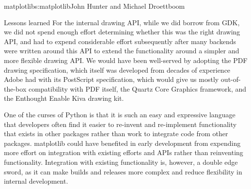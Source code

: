 \begin{aosachapter}{matplotlib}{s:matplotlib}{John Hunter and Michael Droettboom}
\begin{aosasect1}{Lessons learned}
For the internal drawing API, while we did borrow from GDK, we did not
spend enough effort determining whether this was the right drawing
API, and had to expend considerable effort subsequently after many
backends were written around this API to extend the functionality
around a simpler and more flexible drawing API.  We would have been
well-served by adopting the PDF drawing specification, which itself
was developed from decades of experience Adobe had with its PostScript
specification, which would give us mostly out-of-the-box compatibility
with PDF itself, the Quartz Core Graphics framework, and the Enthought
Enable Kiva drawing kit.

One of the curses of Python is that it is such an easy and expressive
language that developers often find it easier to re-invent and
re-implement functionality that exists in other packages rather than
work to integrate code from other packages.  matplotlib could have
benefited in early development from expending more effort on
integration with existing efforts and APIs rather than reinventing
functionality.  Integration with existing functionality is, however, a
double edge sword, as it can make builds and releases more complex and
reduce flexibility in internal development.

\end{aosasect1}
\end{aosachapter}
